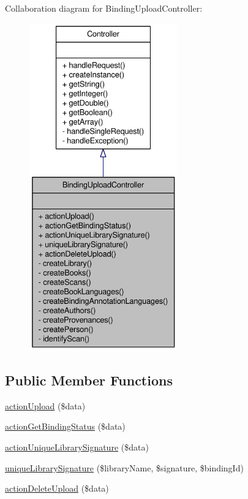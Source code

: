 Collaboration diagram for BindingUploadController:\nopagebreak
\begin{figure}[H]
\begin{center}
\leavevmode
\includegraphics[height=400pt]{classBindingUploadController__coll__graph}
\end{center}
\end{figure}
\subsection*{Public Member Functions}
\begin{DoxyCompactItemize}
\item 
\hyperlink{classBindingUploadController_a00a73d1273ff14289fb98301da75530c}{actionUpload} (\$data)
\item 
\hyperlink{classBindingUploadController_a2735f7ba9c4e31dd3a6c669b44f49b33}{actionGetBindingStatus} (\$data)
\item 
\hyperlink{classBindingUploadController_aa72c03504674104e40038b35f22681fa}{actionUniqueLibrarySignature} (\$data)
\item 
\hyperlink{classBindingUploadController_a7fbce3810bafb07dd69b1636ca49834a}{uniqueLibrarySignature} (\$libraryName, \$signature, \$bindingId)
\item 
\hyperlink{classBindingUploadController_a352c9e62f7dfab9c1cec089fd783d3fb}{actionDeleteUpload} (\$data)
\end{DoxyCompactItemize}


